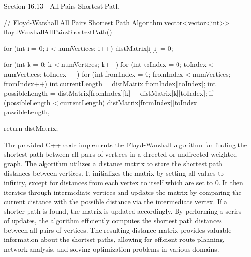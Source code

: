 \begin{notes}{Section 16.13 - All Pairs Shortest Path}
\begin{highlight}
    \begin{code}[C++]
    // Floyd-Warshall All Pairs Shortest Path Algorithm
    vector<vector<int>> floydWarshallAllPairsShortestPath() {
        for (int i = 0; i < numVertices; i++) {
            distMatrix[i][i] = 0;
        }
    
        for (int k = 0; k < numVertices; k++) {
            for (int toIndex = 0; toIndex < numVertices; toIndex++) {
                for (int fromIndex = 0; fromIndex < numVertices; fromIndex++) {
                    int currentLength = distMatrix[fromIndex][toIndex];
                    int possibleLength = distMatrix[fromIndex][k] + distMatrix[k][toIndex];
                    if (possibleLength < currentLength) {
                        distMatrix[fromIndex][toIndex] = possibleLength;
                    }
                }
            }
        }
    
        return distMatrix;
    }
    \end{code}
        The provided C++ code implements the Floyd-Warshall algorithm for finding the shortest path between all pairs of vertices in a directed or undirected weighted graph. The algorithm utilizes a distance matrix to store the shortest 
        path distances between vertices. It initializes the matrix by setting all values to infinity, except for distances from each vertex to itself which are set to 0. It then iterates through intermediate vertices and updates the matrix 
        by comparing the current distance with the possible distance via the intermediate vertex. If a shorter path is found, the matrix is updated accordingly. By performing a series of updates, the algorithm efficiently computes the 
        shortest path distances between all pairs of vertices. The resulting distance matrix provides valuable information about the shortest paths, allowing for efficient route planning, network analysis, and solving optimization problems 
        in various domains.
    \end{highlight}
\end{notes}
